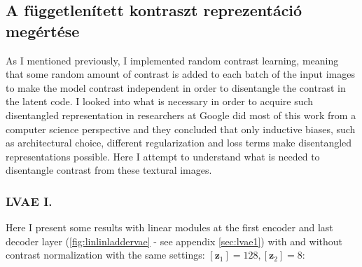 \documentclass[12pt, english]{article}
\begin{document}
\vspace{7mm}

\subsection{A függetlenített kontraszt reprezentáció megértése}

\vspace{5mm}

\par As I mentioned previously, I implemented random contrast learning, meaning that some random amount of contrast is added to each batch of the input images to make the model contrast independent in order to disentangle the contrast in the latent code. I looked into what is necessary in order to acquire such disentangled representation in \cite{locatello2018challenging} researchers at Google did most of this work from a computer science perspective and they concluded that only inductive biases, such as architectural choice, different regularization and loss terms make disentangled representations possible. Here I attempt to understand what is needed to disentangle contrast from these textural images.

\vspace{4mm}

\subsubsection{LVAE I.}

\vspace{4mm}

\par Here I present some results with linear modules at the first encoder and last decoder layer (\ref{fig:linlinladdervae} - see appendix \ref{sec:lvae1}) with and without contrast normalization with the same settings: $[\bm{z}_{1}] = 128, [\bm{z}_{2}] = 8$:

\vspace{4mm}
\end{document}
